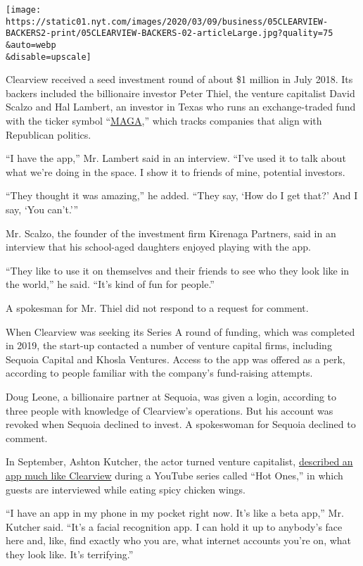 \texttt{[image: https://static01.nyt.com/images/2020/03/09/business/05CLEARVIEW-BACKERS2-print/05CLEARVIEW-BACKERS-02-articleLarge.jpg?quality=75\\\&auto=webp\\\&disable=upscale]}

Clearview received a seed investment round of about \$1 million in July
2018. Its backers included the billionaire investor Peter Thiel, the
venture capitalist David Scalzo and Hal Lambert, an investor in Texas
who runs an exchange-traded fund with the ticker symbol
``\href{https://www.pointbridgecapital.com/etf/}{MAGA},'' which tracks
companies that align with Republican politics.

``I have the app,'' Mr. Lambert said in an interview. ``I've used it to
talk about what we're doing in the space. I show it to friends of mine,
potential investors.

``They thought it was amazing,'' he added. ``They say, `How do I get
that?' And I say, `You can't.'''

Mr. Scalzo, the founder of the investment firm Kirenaga Partners, said
in an interview that his school-aged daughters enjoyed playing with the
app.

``They like to use it on themselves and their friends to see who they
look like in the world,'' he said. ``It's kind of fun for people.''

A spokesman for Mr. Thiel did not respond to a request for comment.

When Clearview was seeking its Series A round of funding, which was
completed in 2019, the start-up contacted a number of venture capital
firms, including Sequoia Capital and Khosla Ventures. Access to the app
was offered as a perk, according to people familiar with the company's
fund-raising attempts.

Doug Leone, a billionaire partner at Sequoia, was given a login,
according to three people with knowledge of Clearview's operations. But
his account was revoked when Sequoia declined to invest. A spokeswoman
for Sequoia declined to comment.

In September, Ashton Kutcher, the actor turned venture capitalist,
\href{https://www.youtube.com/watch?v=nNhYqLbsAGk\&feature=youtu.be\&t=872}{described
an app much like Clearview} during a YouTube series called ``Hot Ones,''
in which guests are interviewed while eating spicy chicken wings.

``I have an app in my phone in my pocket right now. It's like a beta
app,'' Mr. Kutcher said. ``It's a facial recognition app. I can hold it
up to anybody's face here and, like, find exactly who you are, what
internet accounts you're on, what they look like. It's terrifying.''

